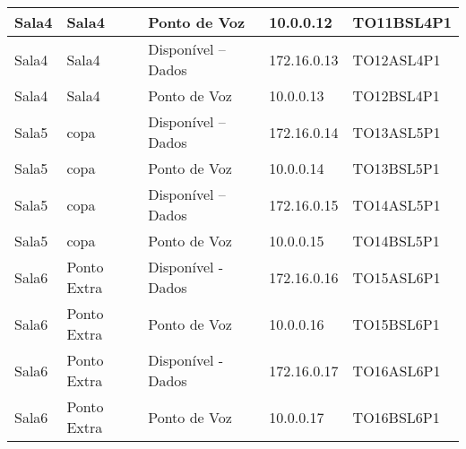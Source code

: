 \begin{table}[]
\begin{tabular}{|l|l|l|l|l|}
Sala4 & Sala4 & Ponto de Voz & 10.0.0.12 & TO11BSL4P1 \\ \hline
Sala4 & Sala4 & Disponível – Dados & 172.16.0.13 & TO12ASL4P1 \\ \hline
Sala4 & Sala4 & Ponto de Voz & 10.0.0.13 & TO12BSL4P1 \\ \hline
Sala5 & copa & Disponível –Dados & 172.16.0.14 & TO13ASL5P1 \\ \hline
Sala5 & copa & Ponto de Voz & 10.0.0.14 & TO13BSL5P1 \\ \hline
Sala5 & copa & Disponível –Dados & 172.16.0.15 & TO14ASL5P1 \\ \hline
Sala5 & copa & Ponto de Voz & 10.0.0.15 & TO14BSL5P1 \\ \hline
Sala6 & Ponto Extra & Disponível -Dados & 172.16.0.16 & TO15ASL6P1 \\ \hline
Sala6 & Ponto Extra & Ponto de Voz & 10.0.0.16 & TO15BSL6P1 \\ \hline
Sala6 & Ponto Extra & Disponível -Dados & 172.16.0.17 & TO16ASL6P1 \\ \hline
Sala6 & Ponto Extra & Ponto de Voz & 10.0.0.17 & TO16BSL6P1 \\ \hline
\end{tabular}
\end{table}